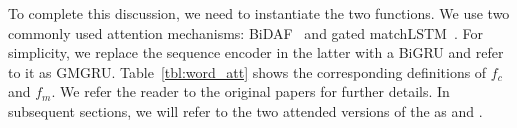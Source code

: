 To complete this discussion, we need to instantiate the two
functions. We use two commonly used attention mechanisms:
BiDAF~\cite{bidaf} and gated matchLSTM~\cite{wang2017gated}. For
simplicity, we replace the sequence encoder in the latter with a
BiGRU and refer to it as GMGRU. Table~\ref{tbl:word_att} shows the
corresponding definitions of $f_{c}$ and $f_{m}$. We refer the
reader to the original papers for further details. In subsequent
sections, we will refer to the two attended versions of the \HGRU as
\BiDAFH and \GMGRUH.




%

